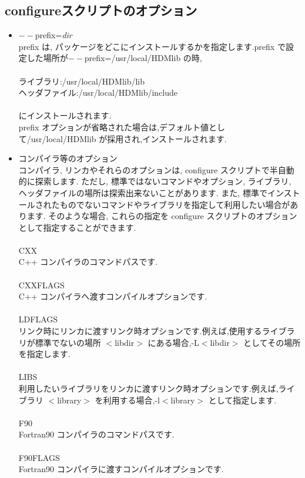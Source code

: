 \documentclass[twoside]{jbook}
\begin{document}
\subsection{configureスクリプトのオプション}
\begin{itemize}
\item {\sf $--$prefix={\it dir\\}}
prefix は, パッケージをどこにインストールするかを指定します.prefix で設定した場所が$--$prefix=/usr/local/HDMlib の時,\\\\
{\sf
ライブラリ:/usr/local/HDMlib/lib\\
ヘッダファイル:/usr/local/HDMlib/include\\\\
}
にインストールされます.\\
prefix オプションが省略された場合は,デフォルト値として/usr/local/HDMlib が採用され,インストールされます.

\item コンパイラ等のオプション\\
コンパイラ, リンカやそれらのオプションは, configure スクリプトで半自動的に探索します. ただし, 標準ではないコマンドやオプション, ライブラリ, ヘッダファイルの場所は探索出来ないことがあります. また, 標準でインストールされたものでないコマンドやライブラリを指定して利用したい場合があります. そのような場合, これらの指定を configure スクリプトのオプションとして指定することができます.\\\\
{\sf CXX\\}
C++ コンパイラのコマンドパスです.\\\\
{\sf CXXFLAGS\\}
C++ コンパイラへ渡すコンパイルオプションです.\\\\
{\sf LDFLAGS\\}
リンク時にリンカに渡すリンク時オプションです.例えば,使用するライブラリが標準でないの場所 $<$libdir$>$ にある場合,-L$<$libdir$>$ としてその場所を指定します.\\\\
{\sf LIBS\\}
利用したいライブラリをリンカに渡すリンク時オプションです.例えば,ライブラリ $<$library$>$ を利用する場合,-l$<$library$>$ として指定します.\\\\
{\sf F90\\}
Fortran90 コンパイラのコマンドパスです.\\\\
{\sf F90FLAGS\\}
Fortran90 コンパイラに渡すコンパイルオプションです.\\\\


\end{itemize}
\end{document}
